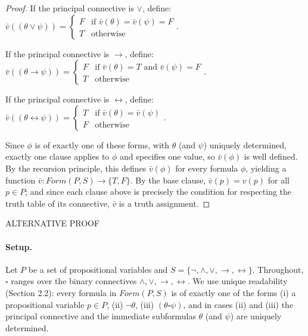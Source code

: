 \documentclass{article}
\theoremstyle{remark}\newtheorem{remark}{Remark}
\begin{document}
\begin{proof}
    If the principal connective is $\lor$, define:
    $\bar{v}((\theta \lor \psi)) = \begin{cases}
        F & \text{if }  \bar{v}(\theta) = \bar{v}(\psi) = F\\
        T & \text{otherwise}
    \end{cases}$.
    
    If the principal connective is $\rightarrow$, define:
    $\bar{v}((\theta \rightarrow \psi)) = \begin{cases}
        F & \text{if }  \bar{v}(\theta) = T \text{ and }\bar{v}(\psi) = F\\
        T & \text{otherwise}
    \end{cases}$.
    
    If the principal connective is $\leftrightarrow$, define:
    $\bar{v}((\theta \leftrightarrow \psi)) = \begin{cases}
        T & \text{if }  \bar{v}(\theta) = \bar{v}(\psi)\\
        F & \text{otherwise}
    \end{cases}$.

    Since $\phi$ is of exactly one of these forms, with $\theta$ (and $\psi$) uniquely determined, exactly one clause applies to $\phi$ and specifies one value, so $\bar{v}(\phi)$ is well defined. By the recursion principle, this defines $\bar{v}(\phi)$ for every formula $\phi$, yielding a function $\bar{v}: Form(P, S) \longrightarrow \{ T, F \}$. By the base clause, $\bar{v}(p) = v(p)$ for all $p \in P$; and since each clause above is precisely the condition for respecting the truth table of its connective, $\bar{v}$ is a truth assignment.
\end{proof}



\newpage
ALTERNATIVE PROOF
\paragraph{Setup.}
Let $P$ be a set of propositional variables and $S = \{\neg, \land, \lor, \rightarrow, \leftrightarrow\}$. Throughout, $\square$ ranges over the binary connectives $\land, \lor, \rightarrow, \leftrightarrow$. We use unique readability (Section 2.2): every formula in $Form(P, S)$ is of exactly one of the forms (i) a propositional variable $p \in P$, (ii) $\neg\theta$, (iii) $(\theta \square \psi)$, and in cases (ii) and (iii) the principal connective and the immediate subformulas $\theta$ (and $\psi$) are uniquely determined.
\end{document}
